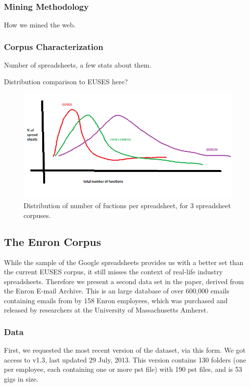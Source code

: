 \documentclass[conference]{IEEEtran}
\begin{document}
\subsubsection{Mining Methodology}

How we mined the web.

\subsubsection{Corpus Characterization}

Number of spreadsheets, a few stats about them.

Distribution comparison to EUSES here?


\begin{figure}[!t]
\centering
\includegraphics[width=\columnwidth]{functions.png}
\caption{Distribution of number of fuctions per spreadsheet, for 3 spreadsheet corpuses.}
\label{fig:functions}
\end{figure}

\subsection{The Enron Corpus}

While the sample of the Google spreadsheets provides us with a better set than the current EUSES corpus, it still misses the context of real-life industry spreadsheets. Therefore we present a second data set in the paper, derived from the Enron E-mail Archive. This is an large database of over 600,000 emails containing emails from by 158 Enron employees, which was purchased and released by researchers at the University of Massachusetts Amherst. 

\subsubsection{Data}
First, we requested the most recent version of the dataset, via this form. We got access to v1.3, last updated 29 July, 2013. This version contains 130 folders (one per employee, each containing one or more pst file) with 190 pst files, and is 53 gigs in size.
\end{document}
